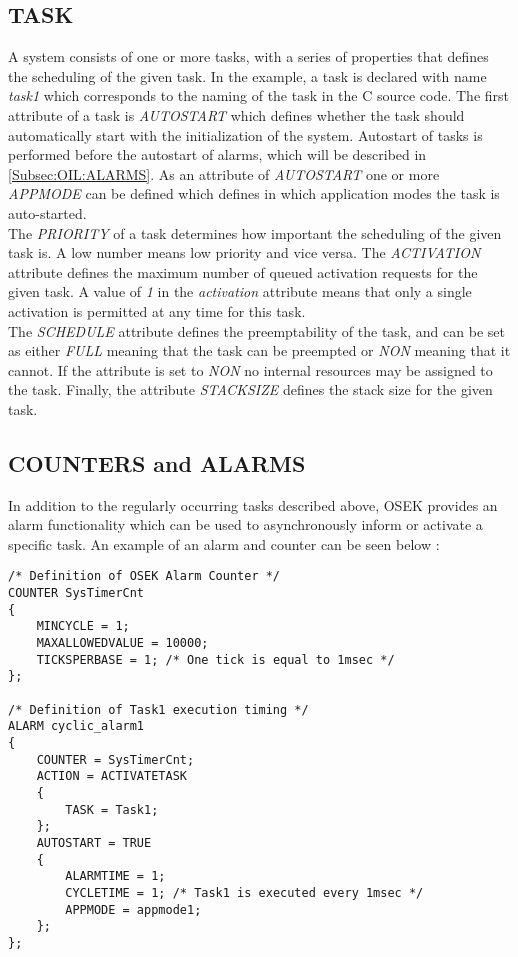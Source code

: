 \subsection{TASK}
A system consists of one or more tasks, with a series of properties that defines the scheduling of the given task.
In the example, a task is declared with name \textit{task1} which corresponds to the naming of the task in the C source code.
The first attribute of a task is \textit{AUTOSTART} which defines whether the task should automatically start with the initialization of the system.
Autostart of tasks is performed before the autostart of alarms, which will be described in \autoref{Subsec:OIL:ALARMS}\cite{irisa223}.
As an attribute of \textit{AUTOSTART} one or more \textit{APPMODE} can be defined which defines in which application modes the task is auto-started.\\
The \textit{PRIORITY} of a task determines how important the scheduling of the given task is.
A low number means low priority and vice versa.
The \textit{ACTIVATION} attribute defines the maximum number of queued activation requests for the given task.
A value of \textit{1} in the \textit{activation} attribute means that only a single activation is permitted at any time for this task.\\
The \textit{SCHEDULE} attribute defines the preemptability of the task, and can be set as either \textit{FULL} meaning that the task can be preempted or \textit{NON} meaning that it cannot.
If the attribute is set to \textit{NON} no internal resources may be assigned to the task\cite{irisa25}.
Finally, the attribute \textit{STACKSIZE} defines the stack size for the given task.

\subsection{COUNTERS and ALARMS}\label{Subsec:OIL:ALARMS}
In addition to the regularly occurring tasks described above, OSEK provides an alarm functionality which can be used to asynchronously inform or activate a specific task.
An example of an alarm and counter can be seen below \cite{rms}:
\begin{lstlisting}
/* Definition of OSEK Alarm Counter */
COUNTER SysTimerCnt
{
    MINCYCLE = 1;
    MAXALLOWEDVALUE = 10000;
    TICKSPERBASE = 1; /* One tick is equal to 1msec */
};

/* Definition of Task1 execution timing */
ALARM cyclic_alarm1
{
    COUNTER = SysTimerCnt;
    ACTION = ACTIVATETASK
    {
        TASK = Task1;
    };
    AUTOSTART = TRUE
    {
        ALARMTIME = 1;
        CYCLETIME = 1; /* Task1 is executed every 1msec */
        APPMODE = appmode1;
    };
};
\end{lstlisting}

